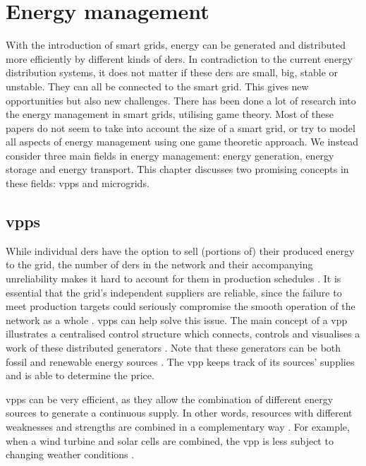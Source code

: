 \section{Energy management}\label{em}
\acresetall
With the introduction of smart grids, energy can be generated and distributed more efficiently by different kinds of \acp{der}. 
In contradiction to the current energy distribution systems, it does not matter if these \acp{der} are small, big, stable or unstable. They can all be connected to the smart grid. This gives new opportunities but also new challenges.
There has been done a lot of research into the energy management in smart grids, utilising game theory\cite{WangOuyangKrishnanEtAl2015, TusharZhangSmithEtAl2013}. Most of these papers do not seem to take into account the size of a smart grid, or try to model all aspects of energy management using one game theoretic approach. We instead consider three main fields in energy management: energy generation, energy storage and energy transport. This chapter discusses two promising concepts in these fields: \acp{vpp} and microgrids. 

\subsection{\aclp{vpp}}\label{vpp}
While individual \acp{der} have the option to sell (portions of) their produced energy to the grid, the number of \acp{der} in the network and their accompanying unreliability makes it hard to account for them in production schedules \cite{RobuKotaChalkiadakisEtAl2012}. It is essential that the grid's independent suppliers are reliable, since the failure to meet production targets could seriously compromise the smooth operation of the network as a whole \cite{ChalkiadakisRobuKotaEtAl2011}. \acp{vpp} can help solve this issue. The main concept of a \ac{vpp} illustrates a centralised control structure which connects, controls and visualises a work of these distributed generators \cite{NikonowiczMilewski2012}. Note that these generators can be both fossil and renewable energy sources \cite{LombardiPowalkoRudion2009}. The \ac{vpp} keeps track of its sources' supplies and is able to determine the price. 

\acp{vpp} can be very efficient, as they allow the combination of different energy sources to generate a continuous supply. In other words, resources with different weaknesses and strengths are combined in a complementary way \cite{Koeppel2003}. For example, when a wind turbine and solar cells are combined, the \ac{vpp} is less subject to changing weather conditions \cite{Tromly2001, Kumagai2012, MashhourMoghaddas-Tafreshi2011, NikonowiczMilewski2012}. 

